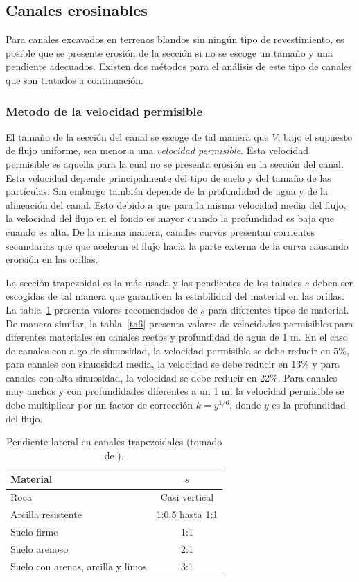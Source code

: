 \documentclass[11pt, oneside]{article}
\begin{document}
\subsection{Canales erosinables}
Para canales excavados en terrenos blandos sin ning\'un tipo de revestimiento, es posible que se presente erosi\'on de la secci\'on si no se escoge un tamaño y una pendiente adecuados. Existen dos m\'etodos para el an\'alisis de este tipo de canales que son tratados a continuaci\'on.

\subsubsection{Metodo de la velocidad permisible}
El tamaño de la secci\'on del canal se escoge de tal manera que $V$, bajo el supuesto de flujo uniforme, sea menor a una \emph{velocidad permisible}. Esta velocidad permisible es aquella para la cual no se presenta erosi\'on en la secci\'on del canal. Esta velocidad depende principalmente del tipo de suelo y del tamaño de las part\'iculas. Sin embargo tambi\'en depende de la profundidad de agua y de la alineaci\'on del canal. Esto debido a que para la misma velocidad media del flujo, la velocidad del flujo en el fondo es mayor cuando la profundidad es baja que cuando es alta. De la misma manera, canales curvos presentan corrientes secundarias que que aceleran el flujo hacia la parte externa de la curva causando erorsi\'on en las orillas. 

La secci\'on trapezoidal es la m\'as usada y las pendientes de los taludes $s$ deben ser escogidas de tal manera que garanticen la estabilidad del material en las orillas. La tabla~\ref{ta5} presenta valores recomendados de $s$ para diferentes tipos de material. De manera similar, la tabla~\ref{ta6} presenta valores de velocidades permisibles para diferentes materiales en canales rectos y profundidad de agua de 1 m. En el caso de canales con algo de sinuosidad, la velocidad permisible se debe reducir en 5\%, para canales con sinuosidad media, la velocidad se debe reducir en 13\% y para canales con alta sinuosidad, la velocidad se debe reducir en 22\%. Para canales muy anchos y con profundidades diferentes a un 1 m, la velocidad permisible se debe multiplicar por un factor de correcci\'on $k=y^{1/6}$, donde $y$ es la profundidad del flujo. 

\begin{table}[h!]
\centering
\begin{tabular}{l c}
 \hline
  Material & $s$ \\ [0.5ex]
 \hline\hline
 Roca & Casi vertical \\
 Arcilla resistente & 1:0.5 hasta 1:1 \\
 Suelo firme & 1:1 \\
 Suelo arenoso & 2:1 \\
 Suelo con arenas, arcilla y limos & 3:1 \\
\hline
\end{tabular}
\caption{Pendiente lateral en canales trapezoidales (tomado de \cite{Chau}).}
\label{ta5}
\end{table}
\end{document}
